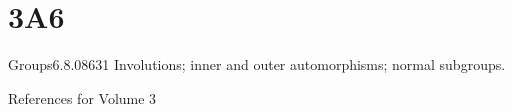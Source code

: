 \section{3A6}{Groups}{6.8.08}{631}{}
{Involutions;  inner and outer automorphisms;  normal subgroups.}
     
\medskip
     
     
\medskip
     
References for Volume 3 
     
     
     
     
     
     
